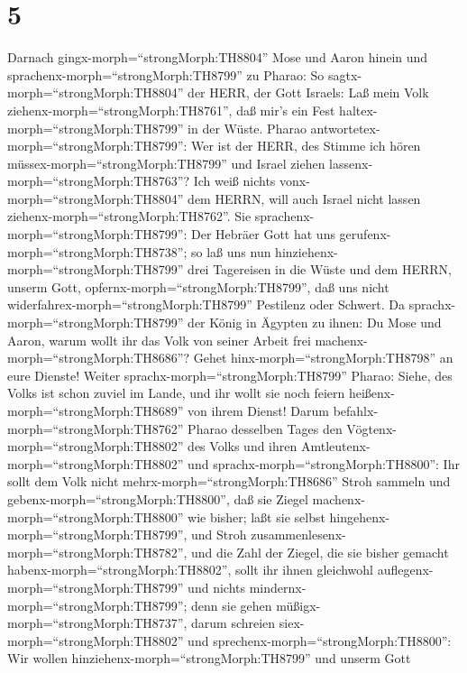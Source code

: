 \hypertarget{section-4}{%
\section{5}\label{section-4}}

 Darnach gingx-morph=``strongMorph:TH8804'' Mose und Aaron
hinein und sprachenx-morph=``strongMorph:TH8799'' zu Pharao: So
sagtx-morph=``strongMorph:TH8804'' der HERR, der Gott Israels: Laß mein
Volk ziehenx-morph=``strongMorph:TH8761'', daß mir's ein Fest
haltex-morph=``strongMorph:TH8799'' in der Wüste.  Pharao
antwortetex-morph=``strongMorph:TH8799'': Wer ist der HERR, des Stimme
ich hören müssex-morph=``strongMorph:TH8799'' und Israel ziehen
lassenx-morph=``strongMorph:TH8763''? Ich weiß nichts
vonx-morph=``strongMorph:TH8804'' dem HERRN, will auch Israel nicht
lassen ziehenx-morph=``strongMorph:TH8762''.  Sie
sprachenx-morph=``strongMorph:TH8799'': Der Hebräer Gott hat uns
gerufenx-morph=``strongMorph:TH8738''; so laß uns nun
hinziehenx-morph=``strongMorph:TH8799'' drei Tagereisen in die Wüste und
dem HERRN, unserm Gott, opfernx-morph=``strongMorph:TH8799'', daß uns
nicht widerfahrex-morph=``strongMorph:TH8799'' Pestilenz oder Schwert.
 Da sprachx-morph=``strongMorph:TH8799'' der König in
Ägypten zu ihnen: Du Mose und Aaron, warum wollt ihr das Volk von seiner
Arbeit frei machenx-morph=``strongMorph:TH8686''? Gehet
hinx-morph=``strongMorph:TH8798'' an eure Dienste!  Weiter
sprachx-morph=``strongMorph:TH8799'' Pharao: Siehe, des Volks ist schon
zuviel im Lande, und ihr wollt sie noch feiern
heißenx-morph=``strongMorph:TH8689'' von ihrem Dienst! 
Darum befahlx-morph=``strongMorph:TH8762'' Pharao desselben Tages den
Vögtenx-morph=``strongMorph:TH8802'' des Volks und ihren
Amtleutenx-morph=``strongMorph:TH8802'' und
sprachx-morph=``strongMorph:TH8800'':  Ihr sollt dem Volk
nicht mehrx-morph=``strongMorph:TH8686'' Stroh sammeln und
gebenx-morph=``strongMorph:TH8800'', daß sie Ziegel
machenx-morph=``strongMorph:TH8800'' wie bisher; laßt sie selbst
hingehenx-morph=``strongMorph:TH8799'', und Stroh
zusammenlesenx-morph=``strongMorph:TH8782'',  und die Zahl
der Ziegel, die sie bisher gemacht habenx-morph=``strongMorph:TH8802'',
sollt ihr ihnen gleichwohl auflegenx-morph=``strongMorph:TH8799'' und
nichts mindernx-morph=``strongMorph:TH8799''; denn sie gehen
müßigx-morph=``strongMorph:TH8737'', darum schreien
siex-morph=``strongMorph:TH8802'' und
sprechenx-morph=``strongMorph:TH8800'': Wir wollen
hinziehenx-morph=``strongMorph:TH8799'' und unserm Gott
